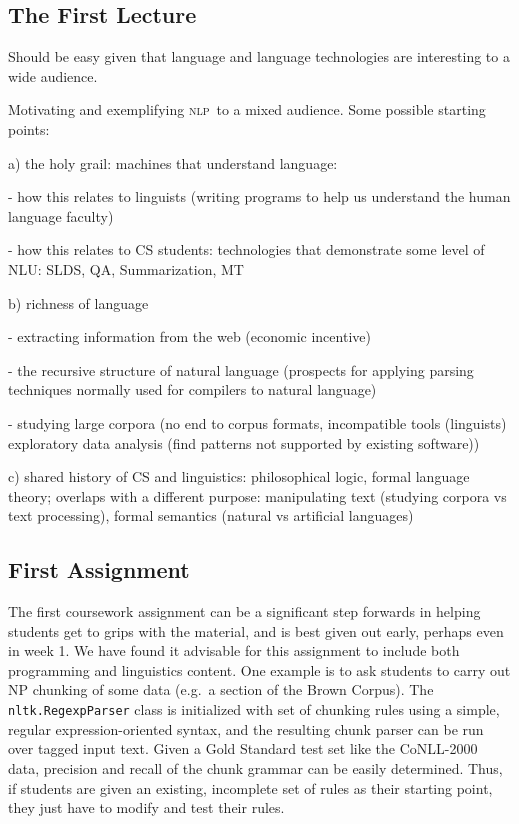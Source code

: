 \documentclass[11pt]{article}
\newcommand{\NLP}{\textsc{nlp}}
\newcommand{\code}[1]{\texttt{\small #1}}
\begin{document}
\subsection{The First Lecture}

Should be easy given that language and language technologies are interesting
to a wide audience.

Motivating and exemplifying \NLP\ to a mixed audience.
Some possible starting points:

a) the holy grail: machines that understand language:

- how this relates to linguists (writing programs to help us
  understand the human language faculty)

- how this relates to CS students: technologies that demonstrate some level of NLU:
  SLDS, QA, Summarization, MT

b) richness of language

- extracting information from the web (economic incentive)

- the recursive structure of natural language (prospects for applying
  parsing techniques normally used for compilers to natural language)

- studying large corpora
  (no end to corpus formats, incompatible tools (linguists)
  exploratory data analysis (find patterns not supported by existing software))

c) shared history of CS and linguistics: philosophical logic, formal language theory;
overlaps with a different purpose:
manipulating text (studying corpora vs text processing),
formal semantics (natural vs artificial languages)

\subsection{First Assignment}

The first coursework assignment can be a significant step forwards in
helping students get to grips with the material, and is best given out
early, perhaps even in week 1.
We have found it advisable for this assignment to
include both programming and linguistics content. One example is to
ask students to carry out NP chunking of some data (e.g.\ a section of
the Brown Corpus). The \code{nltk.RegexpParser} class is initialized
with set of chunking rules using a simple, regular expression-oriented
syntax, and the resulting chunk parser can be run over tagged input
text. Given a Gold Standard test set like the CoNLL-2000 data,
precision and recall of the chunk grammar can be easily determined.
Thus, if students are given an existing, incomplete set of rules as
their starting point, they just have to modify and test their rules. 
\end{document}
